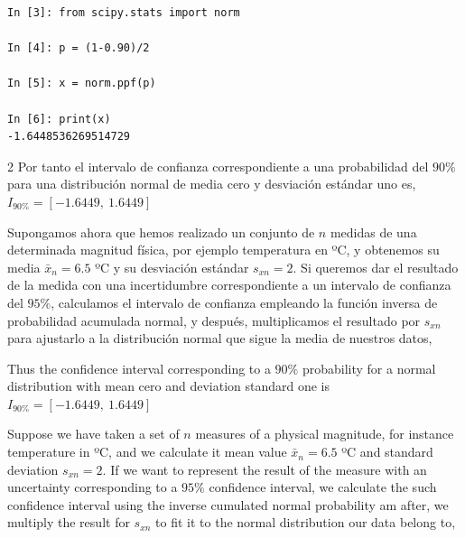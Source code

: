\begin{center}
\begin{minipage}{0.5\textwidth}
	\begin{verbatim}
In [3]: from scipy.stats import norm

In [4]: p = (1-0.90)/2

In [5]: x = norm.ppf(p)

In [6]: print(x)
-1.6448536269514729
\end{verbatim}
\end{minipage}
\end{center}
\begin{paracol}{2}
Por tanto el intervalo de confianza correspondiente a una probabilidad del $90\%$ para una distribución normal de media cero y desviación estándar uno es, \\$I_{90\%} =[-1.6449,\ 1.6449]$

Supongamos ahora que hemos realizado un conjunto de $n$ medidas de una determinada magnitud física, por ejemplo temperatura en ºC, y obtenemos su media $\bar{x}_n=6.5$ ºC y su desviación estándar $s_{xn}=2$. Si queremos dar el resultado de la medida con una incertidumbre correspondiente a un intervalo de confianza del $95\%$, calculamos el intervalo de confianza empleando la función inversa de probabilidad acumulada normal, y después, multiplicamos el resultado por $s_{xn}$ para ajustarlo a la distribución normal que sigue la media de nuestros datos, 

\switchcolumn
Thus the confidence interval corresponding to a $90\%$ probability for a normal distribution with mean cero and deviation standard one is $I_{90\%} =[-1.6449,\ 1.6449]$

Suppose we have taken a set of $n$ measures of a physical magnitude, for instance temperature in ºC, and we calculate it mean value $\bar{x}_n=6.5$ ºC and standard deviation $s_{xn}=2$. If we want to represent the result of the measure with an uncertainty corresponding to a $95\%$ confidence interval, we calculate the such confidence interval using the inverse cumulated normal probability am after, we multiply the result for $s_{xn}$ to fit it to the normal distribution our data belong to,   
\end{paracol}

